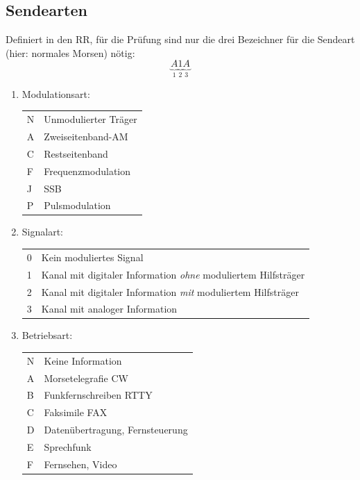 \documentclass[11pt,BCOR=8.5mm]{scrartcl}
\begin{document}
\subsection{Sendearten}\label{sub:sendearten}
Definiert in den RR, für die Prüfung sind nur die drei Bezeichner für
die Sendeart (hier: normales Morsen) nötig:
\begin{equation}
  \underbrace{A}_{1} \underbrace{1}_{2} \underbrace{A}_{3}
\end{equation}
\begin{enumerate}
  \item Modulationsart:

      \begin{tabular}{|l|l|}
        \hline
        N & Unmodulierter Träger\\
        A & Zweiseitenband-AM\\
        C & Restseitenband\\
        F & Frequenzmodulation\\
        J & SSB\\
        P & Pulsmodulation\\
        \hline
      \end{tabular}
  \item Signalart:

      \begin{tabular}{|l|l|}
        \hline
        0 & Kein moduliertes Signal\\
        1 & Kanal mit digitaler Information \emph{ohne}
        moduliertem Hilfsträger\\
        2 & Kanal mit digitaler Information \emph{mit}
        moduliertem Hilfsträger\\
        3 & Kanal mit analoger Information\\
        \hline
      \end{tabular}
  \item Betriebsart:

      \begin{tabular}{|l|l|}
        \hline
        N & Keine Information\\
        A & Morsetelegrafie CW\\
        B & Funkfernschreiben RTTY\\
        C & Faksimile FAX\\
        D & Datenübertragung, Fernsteuerung\\
        E & Sprechfunk\\
        F & Fernsehen, Video\\
        \hline
      \end{tabular}
\end{enumerate}
\end{document}
